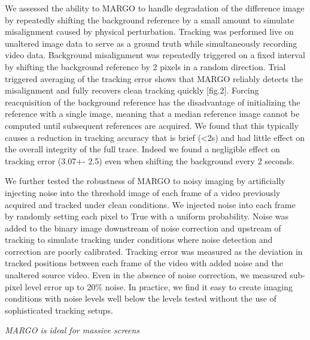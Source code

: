\documentclass[10pt]{article}
\begin{document}
\begin{multicols}{2}
We assessed the ability to MARGO to handle degradation of the difference image by repeatedly shifting the background reference by a small amount to simulate misalignment caused by physical perturbation. Tracking was performed live on unaltered image data to serve as a ground truth while simultaneously recording video data. Background misalignment was repeatedly triggered on a fixed interval by shifting the background reference by 2 pixels in a random direction. Trial triggered averaging of the tracking error shows that MARGO reliably detects the misalignment and fully recovers clean tracking quickly [fig.2]. Forcing reacquisition of the background reference has the disadvantage of initializing the reference with a single image, meaning that a median reference image cannot be computed until subsequent references are acquired. We found that this typically causes a reduction in tracking accuracy that is brief (<2s) and had little effect on the overall integrity of the full trace. Indeed we found a negligible effect on tracking error (3.07+- 2.5) even when shifting the background every 2 seconds.

We further tested the robustness of MARGO to noisy imaging by artificially injecting noise into the threshold image of each frame of a video previously acquired and tracked under clean conditions. We injected noise into each frame by randomly setting each pixel to True with a uniform probability. Noise was added to the binary image downstream of noise correction and upstream of tracking to simulate tracking under conditions where noise detection and correction are poorly calibrated. Tracking error was measured as the deviation in tracked positions between each frame of the video with added noise and the unaltered source video.  Even in the absence of noise correction, we measured sub-pixel level error up to 20\% noise. In practice, we find it easy to create imaging conditions with noise levels well below the levels tested without the use of sophisticated tracking setups.

\textit{MARGO is ideal for massive screens}


\end{multicols}
\end{document}
